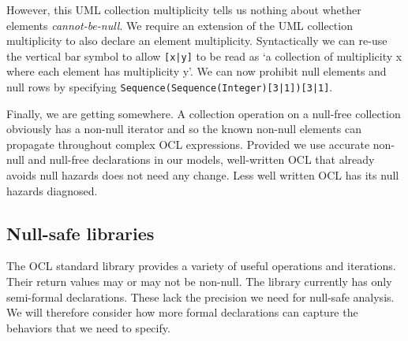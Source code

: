 \documentclass{llncs}
\begin{document}
However, this UML collection multiplicity tells us nothing about whether elements \textit{cannot-be-null}. We require an extension of the UML collection multiplicity to also declare an element multiplicity. Syntactically we can re-use the vertical bar symbol to allow \verb$[x|y]$ to be read as `a collection of multiplicity x where each element has multiplicity y'. We can now prohibit null elements and null rows by specifying \verb$Sequence(Sequence(Integer)[3|1])[3|1]$.

Finally, we are getting somewhere. A collection operation on a null-free collection obviously has a non-null iterator and so the known non-null elements can propagate throughout complex OCL expressions. Provided we use accurate non-null and null-free declarations in our models, well-written OCL that already avoids null hazards does not need any change. Less well written OCL has its null hazards diagnosed.







\subsection{Null-safe libraries}

The OCL standard library provides a variety of useful operations and iterations. Their return values may or may not be non-null. The library currently has only semi-formal declarations. These lack the precision we need for null-safe analysis. We  will therefore consider how more formal declarations can capture the behaviors that we need to specify.
\end{document}
